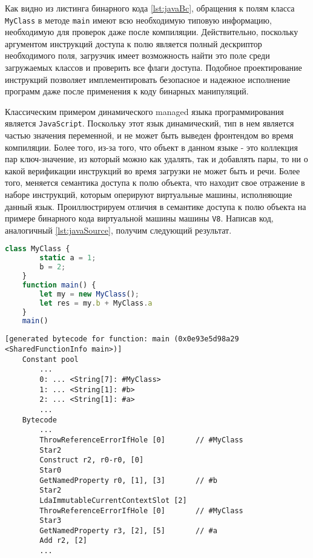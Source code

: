 Как видно из листинга бинарного кода \autoref{lst:javaBc}, обращения к полям класса \texttt{MyClass} в методе \texttt{main} имеют всю необходимую типовую информацию, необходимую для проверок даже после компиляции. Действительно, поскольку аргументом инструкций доступа к полю является полный дескриптор необходимого поля, загрузчик имеет возможность найти это поле среди загружаемых классов и проверить все флаги доступа. Подобное проектирование инструкций позволяет имплементировать безопасное и надежное исполнение программ даже после применения к коду бинарных манипуляций.

Классическим примером динамического managed языка программирования является \texttt{JavaScript}. Поскольку этот язык динамический, тип в нем является частью значения переменной, и не может быть выведен фронтендом во время компиляции. Более того, из-за того, что объект в данном языке - это коллекция пар ключ-значение, из который можно как удалять, так и добавлять пары, то ни о какой верификации инструкций во время загрузки не может быть и речи. Более того, меняется семантика доступа к полю объекта, что находит свое отражение в наборе инструкций, которым оперируют виртуальные машины, исполняющие данный язык. Проиллюстрируем отличия в семантике доступа к полю объекта на примере бинарного кода виртуальной машины машины \texttt{V8}. Написав код, аналогичный \autoref{lst:javaSource}, получим следующий результат.

\begin{lstlisting}[language=Javascript, caption=Исходный код языка \texttt{JavaScript}., label=lst:jsSource]
    class MyClass {
        static a = 1;
        b = 2;
    }
    function main() {
        let my = new MyClass();
        let res = my.b + MyClass.a
    }
    main()
\end{lstlisting}

\begin{lstlisting}[caption=Бинарный код виртуальной машины \texttt{V8}., label=lst:jsBc]
    [generated bytecode for function: main (0x0e93e5d98a29 <SharedFunctionInfo main>)]
    Constant pool
        ...
        0: ... <String[7]: #MyClass>
        1: ... <String[1]: #b>
        2: ... <String[1]: #a>
        ...
    Bytecode
        ...
        ThrowReferenceErrorIfHole [0]       // #MyClass
        Star2
        Construct r2, r0-r0, [0]
        Star0
        GetNamedProperty r0, [1], [3]       // #b
        Star2
        LdaImmutableCurrentContextSlot [2]
        ThrowReferenceErrorIfHole [0]       // #MyClass
        Star3
        GetNamedProperty r3, [2], [5]       // #a
        Add r2, [2]
        ...
\end{lstlisting}

